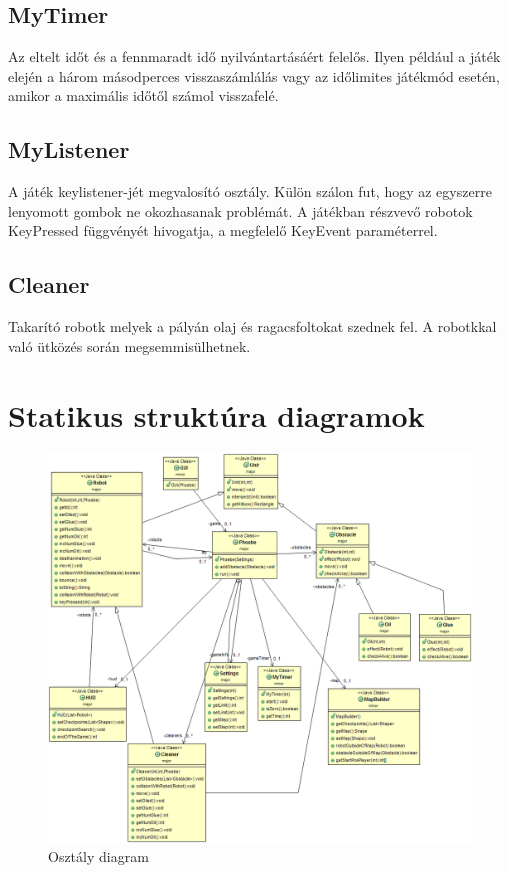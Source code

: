 \subsection{MyTimer}
Az eltelt időt és a fennmaradt idő nyilvántartásáért felelős. Ilyen például a játék elején a három másodperces visszaszámlálás vagy az időlimites játékmód esetén, amikor a maximális időtől számol visszafelé.

\subsection{MyListener}
A játék keylistener-jét megvalosító osztály. Külön szálon fut, hogy az egyszerre lenyomott gombok ne okozhasanak problémát. A játékban részvevő robotok KeyPressed függvényét hivogatja, a megfelelő KeyEvent paraméterrel.
\subsection{Cleaner}
Takarító robotk melyek a pályán olaj és ragacsfoltokat szednek fel. A robotkkal való ütközés során megsemmisülhetnek.
\pagebreak
\section{Statikus struktúra diagramok}

\begin{figure}[h]
\begin{center}
\includegraphics[width=17cm]{images/struktdiagram.PNG}
\caption{Osztály diagram}
\label{fig:example3}
\end{center}
\end{figure}



